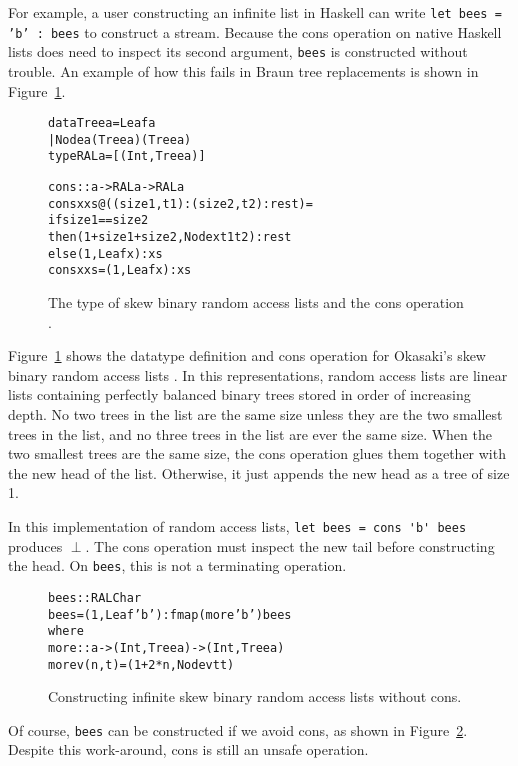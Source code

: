 \documentclass{llncs}
\begin{document}
For example, a user constructing an infinite list in Haskell can write {\tt let bees = 'b' : bees} to construct a stream.
Because the cons operation on native Haskell lists does need to inspect its second argument, \verb|bees| is constructed without trouble.
An example of how this fails in Braun tree replacements is shown in Figure~\ref{consFail}.

\begin{figure}
\begin{alltt}
data Tree a = Leaf a
            | Node a (Tree a) (Tree a)
type RAL a = [(Int,Tree a)]

cons :: a -> RAL a -> RAL a
cons x xs@((size1,t1) : (size2,t2) : rest) =
    if size1 == size2
    then (1 + size1 + size2, Node x t1 t2) : rest
    else (1,Leaf x) : xs
cons x xs = (1,Leaf x) : xs
\end{alltt}
\caption{The type of skew binary random access lists and the cons operation \cite{okasakiSkewLists}.}
\label{consFail}
\end{figure}

Figure~\ref{consFail} shows the datatype definition and cons operation for Okasaki's skew binary random access lists \cite{okasakiSkewLists}.
In this representations, random access lists are linear lists containing perfectly balanced binary trees stored in order of increasing depth.
No two trees in the list are the same size unless they are the two smallest trees in the list, and no three trees in the list are ever the same size.
When the two smallest trees are the same size, the cons operation glues them together with the new head of the list.
Otherwise, it just appends the new head as a tree of size 1.


In this implementation of random access lists, \verb|let bees = cons 'b' bees| produces $\perp$.
The cons operation must inspect the new tail before constructing the head.
On \verb|bees|, this is not a terminating operation.

\begin{figure}
\begin{alltt}
bees :: RAL Char
bees = (1,Leaf 'b') : fmap (more 'b') bees
    where 
      more :: a -> (Int,Tree a) -> (Int,Tree a)
      more v (n,t) = (1 + 2*n, Node v t t)
\end{alltt}
\caption{Constructing infinite skew binary random access lists without cons.}
\label{infiniteSkew}
\end{figure}

Of course, \verb|bees| can be constructed if we avoid cons, as shown in Figure~\ref{infiniteSkew}.
Despite this work-around, cons is still an unsafe operation.
\end{document}

